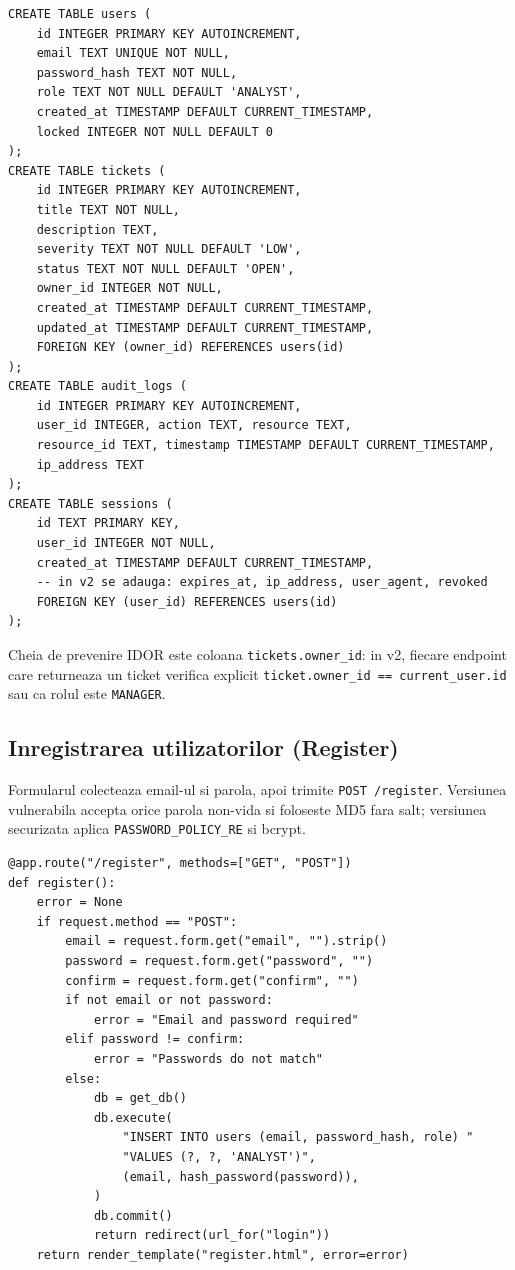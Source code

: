 \documentclass[12pt,a4paper]{article}
\begin{document}
\begin{lstlisting}[style=sqltext, caption={Schema bazei de date (extras din \texttt{init\_db()})}]
CREATE TABLE users (
    id INTEGER PRIMARY KEY AUTOINCREMENT,
    email TEXT UNIQUE NOT NULL,
    password_hash TEXT NOT NULL,
    role TEXT NOT NULL DEFAULT 'ANALYST',
    created_at TIMESTAMP DEFAULT CURRENT_TIMESTAMP,
    locked INTEGER NOT NULL DEFAULT 0
);
CREATE TABLE tickets (
    id INTEGER PRIMARY KEY AUTOINCREMENT,
    title TEXT NOT NULL,
    description TEXT,
    severity TEXT NOT NULL DEFAULT 'LOW',
    status TEXT NOT NULL DEFAULT 'OPEN',
    owner_id INTEGER NOT NULL,
    created_at TIMESTAMP DEFAULT CURRENT_TIMESTAMP,
    updated_at TIMESTAMP DEFAULT CURRENT_TIMESTAMP,
    FOREIGN KEY (owner_id) REFERENCES users(id)
);
CREATE TABLE audit_logs (
    id INTEGER PRIMARY KEY AUTOINCREMENT,
    user_id INTEGER, action TEXT, resource TEXT,
    resource_id TEXT, timestamp TIMESTAMP DEFAULT CURRENT_TIMESTAMP,
    ip_address TEXT
);
CREATE TABLE sessions (
    id TEXT PRIMARY KEY,
    user_id INTEGER NOT NULL,
    created_at TIMESTAMP DEFAULT CURRENT_TIMESTAMP,
    -- in v2 se adauga: expires_at, ip_address, user_agent, revoked
    FOREIGN KEY (user_id) REFERENCES users(id)
);
\end{lstlisting}

Cheia de prevenire IDOR este coloana \texttt{tickets.owner\_id}: in v2,
fiecare endpoint care returneaza un ticket verifica explicit
\texttt{ticket.owner\_id == current\_user.id} sau ca rolul este
\texttt{MANAGER}.

\subsection{Inregistrarea utilizatorilor (Register)}
Formularul colecteaza email-ul si parola, apoi trimite \texttt{POST
/register}. Versiunea vulnerabila accepta orice parola non-vida si
foloseste MD5 fara salt; versiunea securizata aplica
\texttt{PASSWORD\_POLICY\_RE} si bcrypt.

\begin{lstlisting}[style=py, caption={Register (extras din \texttt{vulnerable/app.py})}]
@app.route("/register", methods=["GET", "POST"])
def register():
    error = None
    if request.method == "POST":
        email = request.form.get("email", "").strip()
        password = request.form.get("password", "")
        confirm = request.form.get("confirm", "")
        if not email or not password:
            error = "Email and password required"
        elif password != confirm:
            error = "Passwords do not match"
        else:
            db = get_db()
            db.execute(
                "INSERT INTO users (email, password_hash, role) "
                "VALUES (?, ?, 'ANALYST')",
                (email, hash_password(password)),  
            )
            db.commit()
            return redirect(url_for("login"))
    return render_template("register.html", error=error)
\end{lstlisting}
\end{document}
